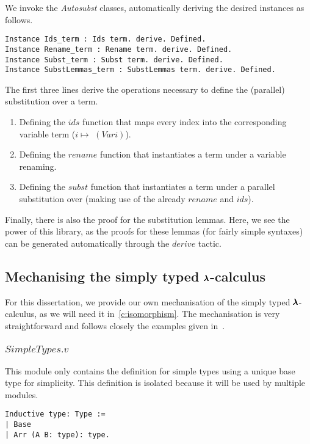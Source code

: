 We invoke the \textit{Autosubst} classes, automatically deriving the desired instances as follows.

\begin{lstlisting}[language=Coq]
Instance Ids_term : Ids term. derive. Defined.
Instance Rename_term : Rename term. derive. Defined.
Instance Subst_term : Subst term. derive. Defined.
Instance SubstLemmas_term : SubstLemmas term. derive. Defined.
\end{lstlisting}

The first three lines derive the operations necessary to define the (parallel) substitution over a term.
\begin{enumerate}
\item Defining the \lst$ids$ function that maps every index into the corresponding variable term ($i \mapsto $ \lst$(Var i)$).
\item Defining the \lst$rename$ function that instantiates a term under a variable renaming.
\item Defining the \lst$subst$ function that instantiates a term under a parallel substitution over (making use of the already \lst$rename$ and \lst$ids$).
\end{enumerate}

Finally, there is also the proof for the substitution lemmas.
Here, we see the power of this library, as the proofs for these lemmas (for fairly simple syntaxes) can be generated automatically through the \lst$derive$ tactic. 


\subsection{Mechanising the simply typed $\pmb{\lambda}$-calculus}

For this dissertation, we provide our own mechanisation of the simply typed $\pmb{\lambda}$-calculus, as we will need it in~\cref{c:isomorphism}.
The mechanisation is very straightforward and follows closely the examples given in~\cite{AutosubstManual,AutosubstSchafer}.

\subsubsection{\lst$SimpleTypes.v$}

This module only contains the definition for simple types using a unique base type for simplicity.
This definition is isolated because it will be used by multiple modules.
\begin{lstlisting}[language=Coq]
Inductive type: Type :=
| Base
| Arr (A B: type): type.
\end{lstlisting}

